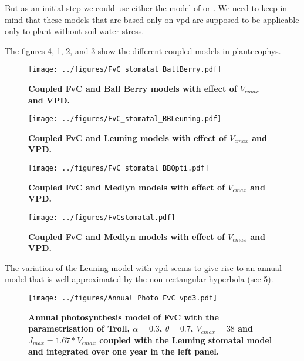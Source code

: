 \documentclass[a4paper,11pt]{article}
\begin{document}
But as an initial step we could use either the model of \citet{Medlyn-2011} or \citet{Leuning-1995}. We need to keep in mind that these models that are based only on vpd are supposed to be applicable only to plant without soil water stress.

The figures \ref{fig:photo_stomat}, \ref{fig:photo_stomat_BB}, \ref{fig:photo_stomat_Leuning}, and \ref{fig:photo_stomat_opti} show the different coupled models in plantecophys.

\begin{figure}[ht]
\centering
\texttt{[image: ../figures/FvC\_stomatal\_BallBerry.pdf]}
\caption{\textbf{Coupled FvC and Ball Berry models with effect of $V_{cmax}$ and VPD.}
\label{fig:photo_stomat_BB}}
\end{figure}

\begin{figure}[ht]
\centering
\texttt{[image: ../figures/FvC\_stomatal\_BBLeuning.pdf]}
\caption{\textbf{Coupled FvC and Leuning models with effect of $V_{cmax}$ and VPD.}
\label{fig:photo_stomat_Leuning}}
\end{figure}

\begin{figure}[ht]
\centering
\texttt{[image: ../figures/FvC\_stomatal\_BBOpti.pdf]}
\caption{\textbf{Coupled FvC and Medlyn models with effect of $V_{cmax}$ and VPD.}
\label{fig:photo_stomat_opti}}
\end{figure}

\begin{figure}[ht]
\centering
\texttt{[image: ../figures/FvCstomatal.pdf]}
\caption{\textbf{Coupled FvC and Medlyn models with effect of $V_{cmax}$ and VPD.}
\label{fig:photo_stomat}}
\end{figure}

\clearpage

The variation of the Leuning model with vpd seems to give rise to an annual model that is well approximated by the non-rectangular hyperbola (see \ref{fig:photo_annu_fvc_vpd3}).

\begin{figure}[ht]
\centering
\texttt{[image: ../figures/Annual\_Photo\_FvC\_vpd3.pdf]}
\caption{\textbf{Annual photosynthesis model of FvC with the parametrisation of Troll, $\alpha = 0.3$, $\theta = 0.7$, $V_{cmax} = 38$ and $J_{max} = 1.67 * V_{cmax}$ coupled with the Leuning stomatal model and integrated over one year in the left panel.}
\label{fig:photo_annu_fvc_vpd3}}
\end{figure}
\end{document}
